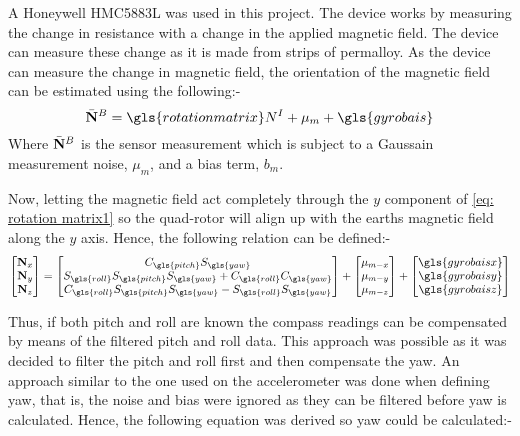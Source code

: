 A Honeywell HMC5883L was used in this project. The device works by measuring the change in resistance with a change in the applied magnetic field. The device can measure these change as it is made from strips of permalloy. As the device can measure the change in magnetic field, the orientation of the magnetic field can be estimated using the following:-  
\begin{equation}
	\bar{\bf N}^B = \gls{rotationmatrix}N^I + \mu_m + \gls{gyrobais} \nonumber
\end{equation}
{Where} $\bar{\bf N}^B$ is the sensor measurement which is subject to a Gaussain measurement noise, $\mu_m$, and a bias term, $b_m$.


Now, letting the magnetic field act completely through the $y$ component of \eqref{eq: rotation matrix1} so the quad-rotor will align up with the earths magnetic field along the $y$ axis. Hence, the following relation can be defined:-
\begin{equation}
	\begin{bmatrix}
		{\bf N}_x \\ {\bf  N}_y \\ {\bf  N}_z 
	\end{bmatrix}
	= 
	\begin{bmatrix}
		C_{\gls{pitch}}S_{\gls{yaw}}                                              \\ 
		S_{\gls{roll}}S_{\gls{pitch}}S_{\gls{yaw}}  + C_{\gls{roll}}C_{\gls{yaw}} \\
		C_{\gls{roll}}S_{\gls{pitch}}S_{\gls{yaw}} - S_{\gls{roll}}S_{\gls{yaw}}
	\end{bmatrix}
	+
	\begin{bmatrix}
		\mu_{m-x} \\ \mu_{m-y}\\\mu_{m-z}
	\end{bmatrix}
	+
	\begin{bmatrix}
		\gls{gyrobaisx} \\ \gls{gyrobaisy}\\\gls{gyrobaisz}
	\end{bmatrix}\label{eq: magnetometer read out}
\end{equation}

Thus, if both \gls{pitch} and \gls{roll} are known the compass readings can be compensated by means of the filtered \gls{pitch} and \gls{roll} data. This approach was possible as it was decided to filter the \gls{pitch} and \gls{roll} first and then compensate the \gls{yaw}. An approach similar to the one used on the accelerometer was done when defining \gls{yaw}, that is, the noise and bias were ignored as they can be filtered before \gls{yaw} is calculated. Hence, the following equation was derived so \gls{yaw} could be calculated:-

